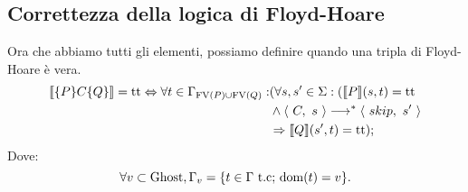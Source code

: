\subsection{Correttezza della logica di Floyd-Hoare}

\begin{definizione} 
Ora che abbiamo tutti gli elementi, possiamo definire quando una tripla di Floyd-Hoare è vera.
\begin{align*}
    \llbracket \{P\} C\{Q\} \rrbracket 
       = \mathrm{tt} \Leftrightarrow \forall t \in \Gamma_{\mathrm{FV}(P)\cup \mathrm{FV}(Q)}\mathrel{:}
       &(\forall  s,s'\in \Sigma\mathrel{:}(\llbracket P \rrbracket(s,t) = \mathrm{tt}\\
       &\land \langle\ C,\ s\ \rangle \longrightarrow ^*\langle\ skip,\ s'\ \rangle\\
       &\Rightarrow\llbracket Q \rrbracket(s',t)=\mathrm{tt});
\end{align*}
Dove:
\[
   \forall v \subset \mathrm{Ghost},\Gamma_{v} =\{t \in \Gamma \text{ t.c; $\mathop{\mathrm{dom}}\nolimits(t) = v$\}}.
\]
\end{definizione}

